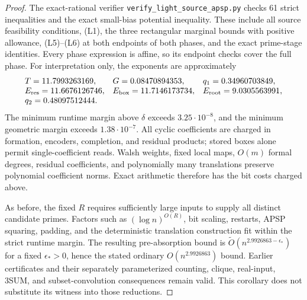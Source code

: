 \documentclass[11pt]{article}
\newcommand{\softO}{\widetilde O}
\begin{document}
\begin{proof}
The exact-rational verifier
\texttt{verify\_light\_source\_apsp.py} checks 61 strict inequalities
and the exact small-bias potential inequality. These include all
source feasibility conditions, (L1), the three rectangular marginal
bounds with positive allowance, (L5)--(L6) at both endpoints of both
phases, and the exact prime-stage identities. Every phase expression
is affine, so its endpoint checks cover the full phase.
For interpretation only, the exponents are approximately
\[
\begin{array}{lll}
 T=11.7993263169,&G=0.08470894353,&q_1=0.34960703849,\\
 E_{\rm res}=11.6676126746,&E_{\rm box}=11.7146173734,
 &E_{\rm root}=9.0305563991,\\
 q_2=0.48097512444.&&
\end{array}
\]
The minimum runtime margin above $\delta$ exceeds
$3.25\cdot10^{-8}$, and the minimum geometric margin exceeds
$1.38\cdot10^{-7}$. All cyclic coefficients are charged in
formation, encoders, completion, and residual products; stored boxes
alone permit single-coefficient reads. Walsh weights, fixed local
maps, $O(m)$ formal degrees, residual coefficients, and polynomially
many translations preserve polynomial coefficient norms.
Exact arithmetic therefore has the bit costs charged above.

As before, the fixed $R$ requires sufficiently large inputs to
supply all distinct candidate primes. Factors such as
$(\log n)^{O(R)}$, bit scaling, restarts, APSP squaring, padding,
and the deterministic translation construction fit within the
strict runtime margin. The resulting pre-absorption bound is
$\softO(n^{2.9926863-\epsilon_*})$ for a fixed $\epsilon_*>0$,
hence the stated ordinary $O(n^{2.9926863})$ bound. Earlier
certificates and their separately parameterized counting, clique,
real-input, 3SUM, and subset-convolution consequences remain valid.
This corollary does not substitute its witness into those reductions.
\end{proof}
\end{document}
